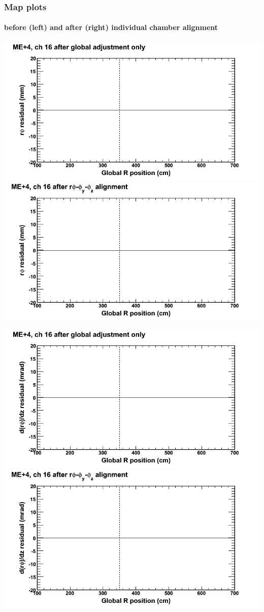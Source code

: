 \documentclass[compress]{beamer}
\begin{document}
\begin{frame}
\frametitle{Map plots}
\framesubtitle{before (left) and after (right) individual chamber alignment}
\includegraphics[width=0.5\linewidth]{ringmapplots_3dof/before_CSCvsr_mep4ch16_x.png} \includegraphics[width=0.5\linewidth]{ringmapplots_3dof/after_CSCvsr_mep4ch16_x.png}

\includegraphics[width=0.5\linewidth]{ringmapplots_3dof/before_CSCvsr_mep4ch16_dxdz.png} \includegraphics[width=0.5\linewidth]{ringmapplots_3dof/after_CSCvsr_mep4ch16_dxdz.png}
\end{frame}
\end{document}
